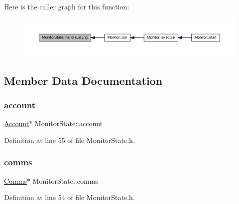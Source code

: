 Here is the caller graph for this function\+:\nopagebreak
\begin{figure}[H]
\begin{center}
\leavevmode
\includegraphics[width=350pt]{dd/d45/class_monitor_state_a8c8b871e3e8308e11f35905dd8741878_icgraph}
\end{center}
\end{figure}


\subsection{Member Data Documentation}
\mbox{\label{class_monitor_state_a41128d4942ec0d5b107c63d1d95af811}} 
\subsubsection{\texorpdfstring{account}{account}}
{\footnotesize\ttfamily \hyperlink{class_account}{Account}$\ast$ Monitor\+State\+::account\hspace{0.3cm}{\ttfamily [protected]}}



Definition at line 55 of file Monitor\+State.\+h.

\mbox{\label{class_monitor_state_a41914e9963c67ef2d17774f04bad3518}} 
\subsubsection{\texorpdfstring{comms}{comms}}
{\footnotesize\ttfamily \hyperlink{class_comms}{Comms}$\ast$ Monitor\+State\+::comms\hspace{0.3cm}{\ttfamily [protected]}}



Definition at line 54 of file Monitor\+State.\+h.

\mbox{\label{class_monitor_state_aaeef0ae307bb9cfcbb4fcb08c115fb0f}} 

